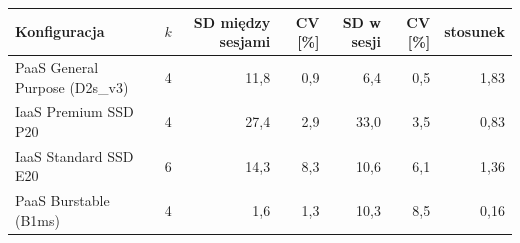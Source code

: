 \begin{tabular}{lrrrrrr}
\toprule
Konfiguracja & $k$ & SD między sesjami & CV [\%] & SD w sesji & CV [\%] & stosunek \\
\midrule
PaaS General Purpose (D2s\_v3) & 4 & 11,8 & 0,9 & 6,4 & 0,5 & 1,83 \\
IaaS Premium SSD P20 & 4 & 27,4 & 2,9 & 33,0 & 3,5 & 0,83 \\
IaaS Standard SSD E20 & 6 & 14,3 & 8,3 & 10,6 & 6,1 & 1,36 \\
PaaS Burstable (B1ms) & 4 & 1,6 & 1,3 & 10,3 & 8,5 & 0,16 \\
\bottomrule
\end{tabular}
